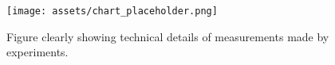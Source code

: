 


\begin{figure}[h]
    \centering
    \begin{minipage}{0.3\linewidth}
        \centering
        \texttt{[image: assets/chart\_placeholder.png]}
    \end{minipage}
    \caption{Figure clearly showing technical details of measurements made by experiments.}
    \label{fig:system}
    \end{figure}






